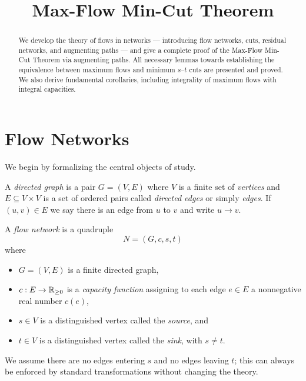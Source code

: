 \documentclass[11pt]{article}
\begin{document}
\title{Max-Flow Min-Cut Theorem}
\author{}
\date{}
\maketitle

\begin{abstract}
    We develop the theory of flows in networks --- introducing flow networks, cuts, residual networks, and augmenting paths --- and give a complete proof of the Max-Flow Min-Cut Theorem via augmenting paths. All necessary lemmas towards establishing the equivalence between maximum flows and minimum $s$--$t$ cuts are presented and proved. We also derive fundamental corollaries, including integrality of maximum flows with integral capacities.
\end{abstract}

\section{Flow Networks}

We begin by formalizing the central objects of study.

\begin{definition}
A \emph{directed graph} is a pair $G=(V,E)$ where $V$ is a finite set of
\emph{vertices} and $E \subseteq V \times V$ is a set of ordered pairs called
\emph{directed edges} or simply \emph{edges}. If $(u,v)\in E$ we say there is
an edge from $u$ to $v$ and write $u \to v$.
\end{definition}

\begin{definition}
A \emph{flow network} is a quadruple
\[
  N = (G,c,s,t)
\]
where
\begin{itemize}[itemsep=0.2em]
  \item $G=(V,E)$ is a finite directed graph,
  \item $c : E \to \mathbb{R}_{\ge 0}$ is a \emph{capacity function} assigning to each
        edge $e\in E$ a nonnegative real number $c(e)$,
  \item $s \in V$ is a distinguished vertex called the \emph{source}, and
  \item $t \in V$ is a distinguished vertex called the \emph{sink}, with
        $s \ne t$.
\end{itemize}
We assume there are no edges entering $s$ and no edges leaving $t$; this can
always be enforced by standard transformations without changing the theory.
\end{definition}
\end{document}
